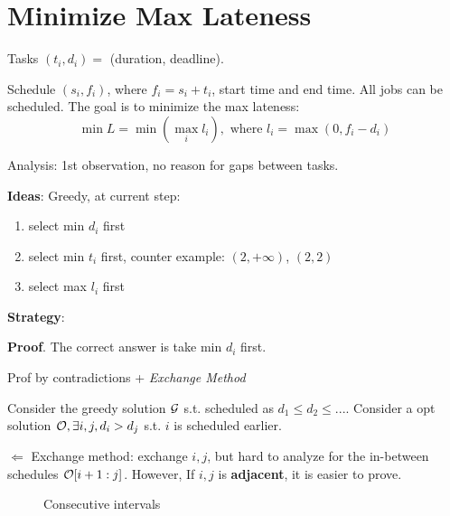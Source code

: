 \documentclass[a4paper]{report}
\theoremstyle{definition}
\begin{document}
\section{Minimize Max Lateness}
Tasks $(t_i, d_i)=$ (duration, deadline).

Schedule $(s_i, f_i)$, where $f_i=s_i+t_i$, start time and end time. All jobs can be scheduled. The goal is to minimize the max lateness:
$$
\min L = \min(\max_i l_i), \text{ where } l_i=\max(0, f_i-d_i)
$$

Analysis: 1st observation, no reason for gaps between tasks.

\textbf{Ideas}: Greedy, at current step:
\begin{enumerate}
\item select min $d_i$ first
\item select min $t_i$ first, counter example: $(2, +\infty)$, $(2, 2)$
\item select max $l_i$ first
\end{enumerate}

\textbf{Strategy}:

\textbf{Proof}. The correct answer is take min $d_i$ first.

Prof by contradictions + \textit{Exchange Method}

Consider the greedy solution $\mathcal{G}$ s.t. scheduled as $d_1 \leq d_2\leq ...$. Consider a opt solution $\mathcal{O}, \exists i,j, d_i > d_j$ s.t. $i$ is scheduled earlier.

$\Leftarrow$ Exchange method: exchange $i, j$, but hard to analyze for the in-between schedules $\mathcal{O}[i+1:j]$. However, If $i, j$ is \textbf{adjacent}, it is easier to prove.
\begin{figure}[!htp]
\centering
{}
\caption{Consecutive intervals}
\label{fig:4_6}
\end{figure}
\end{document}
